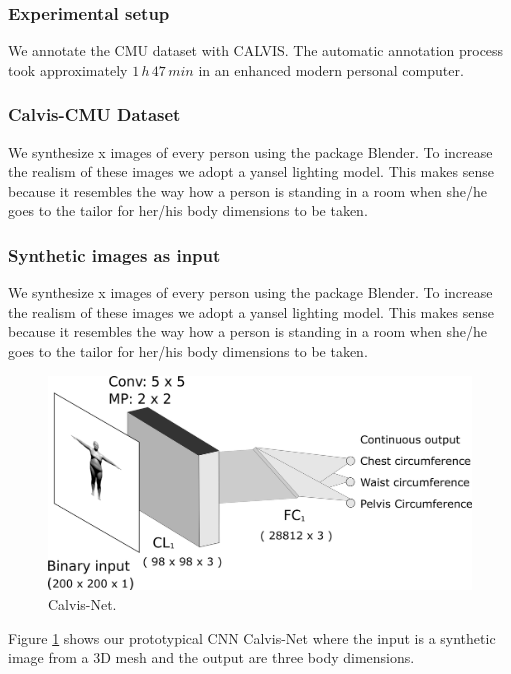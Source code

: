 \documentclass[runningheads, orivec]{llncs}
\begin{document}
\subsubsection{Experimental setup} We annotate the CMU dataset with CALVIS. The 
automatic annotation process took approximately $1\,h\, 47\, min$ in an 
enhanced 
modern personal computer.

\subsubsection{Calvis-CMU Dataset} We synthesize x images of every 
person using the package Blender. To increase the realism of these images we 
adopt a yansel lighting model. This makes sense because it resembles the way 
how a person is standing in a room when she/he goes to the tailor for her/his 
body dimensions to be taken.

\subsubsection{Synthetic images as input} We synthesize x images of every 
person using the package Blender. To increase the realism of these images we 
adopt a yansel lighting model. This makes sense because it resembles the way 
how a person is standing in a room when she/he goes to the tailor for her/his 
body dimensions to be taken.

\begin{figure}[H]
	\begin{center}
		\includegraphics[width=\linewidth]{Calvis-Net.png}
	\end{center}
	\caption{Calvis-Net.}
	\label{fig:calvis_net}
\end{figure}

Figure \ref{fig:calvis_net} shows our prototypical CNN Calvis-Net where the 
input is a synthetic image from a 3D mesh and the output are three body 
dimensions.
\end{document}

